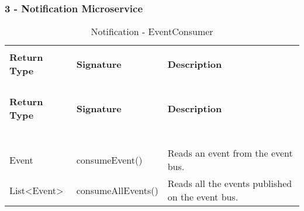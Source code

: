 \subsubsection{3 - Notification Microservice}

\begin{longtable}{p{}p{}p{}}
    \caption{Notification - EventConsumer}
    \vspace{0.5em}\\
    \hline
    \vspace{0.5em}\\
    \textbf{Return Type} & \textbf{Signature} & \textbf{Description} \\
    \vspace{0.5em}\\
    \hline
    \vspace{0.5em}\\
    \endfirsthead
    \vspace{0.5em}\\
    \hline
    \vspace{0.5em}\\
    \textbf{Return Type} & \textbf{Signature} & \textbf{Description} \\
    \vspace{0.5em}\\
    \hline
    \vspace{0.5em}\\
    \endhead
    
    \vspace{0.5em}\\
    \hline
    \vspace{0.5em}\\
    \endfoot
    
    \vspace{0.5em}\\
    \hline
    \vspace{0.5em}\\
    \endlastfoot
    
    Event &
    consumeEvent() &
    Reads an event from the event bus.
    \vspace{0.5em}\\
    List<Event> &
    consumeAllEvents() &
    Reads all the events published on the event bus. \\

\end{longtable}

